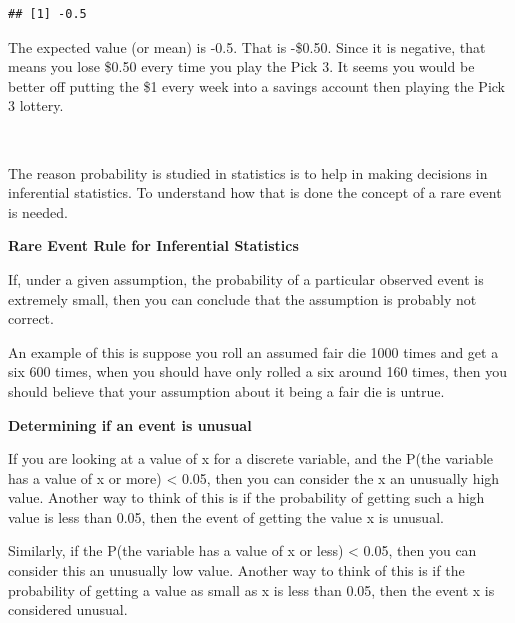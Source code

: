 \documentclass[
]{book}
\begin{document}
\begin{verbatim}
## [1] -0.5
\end{verbatim}

The expected value (or mean) is -0.5. That is -\$0.50. Since it is negative, that means you lose \$0.50 every time you play the Pick 3. It seems you would be better off putting the \$1 every week into a savings account then playing the Pick 3 lottery.

\emph{\\
}

The reason probability is studied in statistics is to help in making decisions in inferential statistics. To understand how that is done the concept of a rare event is needed.

\textbf{Rare Event Rule for Inferential Statistics}

If, under a given assumption, the probability of a particular observed event is extremely small, then you can conclude that the assumption is probably not correct.

An example of this is suppose you roll an assumed fair die 1000 times and get a six 600 times, when you should have only rolled a six around 160 times, then you should believe that your assumption about it being a fair die is untrue.

\textbf{Determining if an event is unusual}

If you are looking at a value of x for a discrete variable, and the P(the variable has a value of x or more) \textless{} 0.05, then you can consider the x an unusually high value. Another way to think of this is if the probability of getting such a high value is less than 0.05, then the event of getting the value x is unusual.

Similarly, if the P(the variable has a value of x or less) \textless{} 0.05, then you can consider this an unusually low value. Another way to think of this is if the probability of getting a value as small as x is less than 0.05, then the event x is considered unusual.
\end{document}
